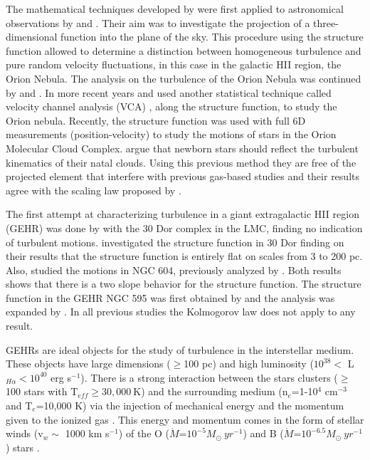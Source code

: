 \documentclass[fleqn,usenatbib]{mnras}
\begin{document}
The mathematical techniques developed by \citet{kolm1,heisenberg1951stability} were first applied to astronomical observations by \citet{von1951methode} and \citet{munch1958internal}. Their aim was to investigate the projection of a three-dimensional function into the plane of the sky. This procedure using the structure function allowed to determine a distinction between homogeneous turbulence and pure random velocity fluctuations, in this case in the galactic HII region, the Orion Nebula. The analysis on the turbulence of the Orion Nebula was continued by \citet{castaneda1987} and \citet{1992ApJ...387..229O}. In more recent years \cite{medina2014} and \cite{arthur2016turbulence} used another statistical technique called velocity channel analysis (VCA) \citep{2000ApJ...537..720L}, along the structure function, to study the Orion nebula. Recently, the structure function was used with full 6D measurements (position-velocity) to study the motions of stars in the Orion Molecular Cloud Complex. \cite{2021ApJ...907L..40H} argue that newborn stars should reflect the turbulent kinematics of their natal clouds. Using this previous method they are free of the projected element that interfere with previous gas-based studies and their results agree with the scaling law proposed by \cite{1981MNRAS.194..809L}.  

The first attempt at characterizing turbulence in a giant extragalactic HII region (GEHR) was done by \citet{1961MNRAS.122....1F} with the 30 Dor complex in the LMC, finding no indication of turbulent motions. \cite{2019arXiv191203543M} investigated the structure function in 30 Dor finding on their results that the structure function is entirely flat on scales from 3 to 200 pc. Also, \cite{2019arXiv191203543M} studied the motions in NGC 604, previously analyzed by \cite{tanco1997}. Both results shows that there is a two slope behavior for the structure function. The structure function in the GEHR NGC 595 was first obtained by \cite{lagrois2009multi} and the analysis was expanded by \cite{lagrois2011}. In all previous studies the Kolmogorov law does not apply to any result.

GEHRs are ideal objects for the study of turbulence in the interstellar medium. These objects have large dimensions ($ \geq $100 pc) and high luminosity ($10^{38}<$ L$_{H\alpha}<10^{40}$ erg s$^{-1}$). There is a strong interaction between the stars clusters ($\geq$100 stars with T$_{eff}\geq30,000\ $K) and the surrounding medium (n$_{e}$=1-10$^4$ cm$^{-3}$ and T$_{e}$=10,000 K) via the injection of mechanical energy and the momentum given to the ionized gas \citep{castaneda1992density}. This energy and momentum comes in the form of stellar winds (v$_{w}\sim$ 1000 km s$^{-1}$) of the O ($\dot{M}$=$10^{-5} M_{\odot}\ yr^{-1}$) and B ($\dot{M}$=$10^{-6.5} M_{\odot}\ yr^{-1}$) stars \citep{dyson1979}.
\end{document}
